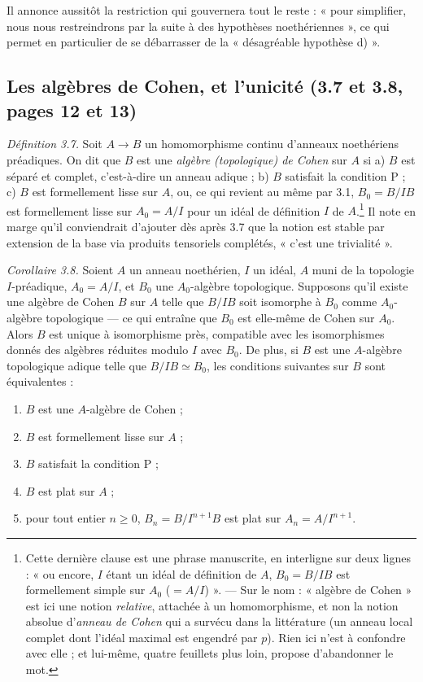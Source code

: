 \documentclass[11pt,a4paper]{article}
\begin{document}
Il annonce aussitôt la restriction qui gouvernera tout le reste : « pour
simplifier, nous nous restreindrons par la suite à des hypothèses
noethériennes », ce qui permet en particulier de se débarrasser de la
« désagréable hypothèse d) ».

\subsection*{Les algèbres de Cohen, et l'unicité (3.7 et 3.8, pages 12 et 13)}

\emph{Définition 3.7.} Soit $A \to B$ un homomorphisme continu d'anneaux
noethériens préadiques. On dit que $B$ est une \emph{algèbre (topologique) de
Cohen} sur $A$ si a) $B$ est séparé et complet, c'est-à-dire un anneau adique ;
b) $B$ satisfait la condition P ; c) $B$ est formellement lisse sur $A$, ou, ce
qui revient au même par 3.1, $B_0 = B/IB$ est formellement lisse sur
$A_0 = A/I$ pour un idéal de définition $I$ de $A$.\footnote{Cette dernière
clause est une phrase manuscrite, en interligne sur deux lignes : « ou encore,
$I$ étant un idéal de définition de $A$, $B_0 = B/IB$ est formellement simple
sur $A_0$ ($= A/I$) ». — Sur le nom : « algèbre de Cohen » est ici une
notion \emph{relative}, attachée à un homomorphisme, et non la notion absolue
d'\emph{anneau de Cohen} qui a survécu dans la littérature (un anneau local
complet dont l'idéal maximal est engendré par $p$). Rien ici n'est à
confondre avec elle ; et lui-même, quatre feuillets plus loin, propose
d'abandonner le mot.} Il note en marge qu'il conviendrait d'ajouter dès après
3.7 que la notion est stable par extension de la base via produits tensoriels
complétés, « c'est une trivialité ».

\emph{Corollaire 3.8.} Soient $A$ un anneau noethérien, $I$ un idéal, $A$ muni
de la topologie $I$-préadique, $A_0 = A/I$, et $B_0$ une $A_0$-algèbre
topologique. Supposons qu'il existe une algèbre de Cohen $B$ sur $A$ telle que
$B/IB$ soit isomorphe à $B_0$ comme $A_0$-algèbre topologique — ce qui entraîne
que $B_0$ est elle-même de Cohen sur $A_0$. Alors $B$ est unique à isomorphisme
près, compatible avec les isomorphismes donnés des algèbres réduites modulo
$I$ avec $B_0$. De plus, si $B$ est une $A$-algèbre topologique adique telle que
$B/IB \simeq B_0$, les conditions suivantes sur $B$ sont équivalentes :

\begin{enumerate}
  \item[0)] $B$ est une $A$-algèbre de Cohen ;
  \item[1)] $B$ est formellement lisse sur $A$ ;
  \item[2)] $B$ satisfait la condition P ;
  \item[3)] $B$ est plat sur $A$ ;
  \item[3 bis)] pour tout entier $n \geqslant 0$, $B_n = B/I^{n+1}B$ est plat
  sur $A_n = A/I^{n+1}$.
\end{enumerate}
\end{document}
